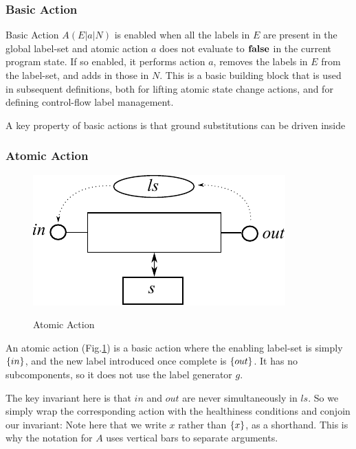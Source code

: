 \subsubsection{Basic Action}\label{sssec:basic-action}

Basic Action $A(E|a|N)$ is enabled when all the labels in $E$
are present in the global label-set
and atomic action $a$ does not evaluate to $\mathbf{false}$
in the current program state.
If so enabled,  it performs action $a$, removes the labels in $E$
from the label-set, and adds in those in $N$.
This is a basic building block that is used in subsequent
definitions, both for lifting atomic state change actions,
and for defining control-flow label management.

A key property of basic actions is that ground substitutions
can be driven inside


\newpage
\subsubsection{Atomic Action}

\begin{figure}
  \centering
  \includegraphics{images/atomic-action}\\
  \caption{Atomic Action}
  \label{fig:atomic-action}
\end{figure}

An atomic action (Fig.\ref{fig:atomic-action})
is a basic action where the enabling label-set is
simply $\{in\}$, and the new label introduced once complete
is $\{out\}$.
It has no subcomponents, so it does not use the label generator $g$.

The key invariant here is that $in$ and $out$ are never simultaneously
in $ls$.
So we simply wrap the corresponding action with the healthiness conditions
and conjoin our invariant:
Note here that we write $x$ rather than $\{x\}$, as a shorthand.
This is why the notation for $A$ uses vertical bars to separate arguments.

